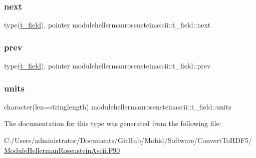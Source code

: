 \subsubsection{\texorpdfstring{next}{next}}
{\footnotesize\ttfamily type(\mbox{\hyperlink{structmodulehellermanrosensteinascii_1_1t__field}{t\+\_\+field}}), pointer modulehellermanrosensteinascii\+::t\+\_\+field\+::next\hspace{0.3cm}{\ttfamily [private]}}

\mbox{\label{structmodulehellermanrosensteinascii_1_1t__field_aa6ecc2ee4fa73054e3c7b29498901c25}} 
\subsubsection{\texorpdfstring{prev}{prev}}
{\footnotesize\ttfamily type(\mbox{\hyperlink{structmodulehellermanrosensteinascii_1_1t__field}{t\+\_\+field}}), pointer modulehellermanrosensteinascii\+::t\+\_\+field\+::prev\hspace{0.3cm}{\ttfamily [private]}}

\mbox{\label{structmodulehellermanrosensteinascii_1_1t__field_a49532f5297768e45ae7d31be02b8534e}} 
\subsubsection{\texorpdfstring{units}{units}}
{\footnotesize\ttfamily character(len=stringlength) modulehellermanrosensteinascii\+::t\+\_\+field\+::units\hspace{0.3cm}{\ttfamily [private]}}



The documentation for this type was generated from the following file\+:\begin{DoxyCompactItemize}
\item 
C\+:/\+Users/administrator/\+Documents/\+Git\+Hub/\+Mohid/\+Software/\+Convert\+To\+H\+D\+F5/\mbox{\hyperlink{_module_hellerman_rosenstein_ascii_8_f90}{Module\+Hellerman\+Rosenstein\+Ascii.\+F90}}\end{DoxyCompactItemize}
